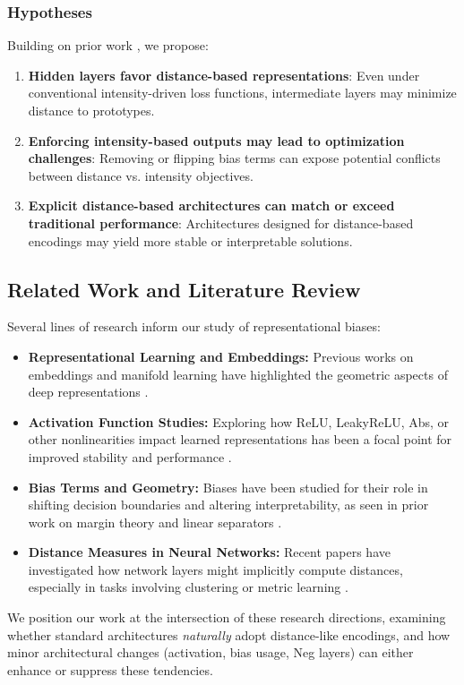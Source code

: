 \subsubsection{Hypotheses}
Building on prior work \cite{oursland2024,bishop2006pattern}, we propose:
\begin{enumerate}
    \item \textbf{Hidden layers favor distance-based representations}: Even under conventional intensity-driven loss functions, intermediate layers may minimize distance to prototypes.
    \item \textbf{Enforcing intensity-based outputs may lead to optimization challenges}: Removing or flipping bias terms can expose potential conflicts between distance vs. intensity objectives.
    \item \textbf{Explicit distance-based architectures can match or exceed traditional performance}: Architectures designed for distance-based encodings may yield more stable or interpretable solutions.
\end{enumerate}

\subsection{Related Work and Literature Review}
Several lines of research inform our study of representational biases:
\begin{itemize}
    \item \textbf{Representational Learning and Embeddings:} Previous works on embeddings and manifold learning have highlighted the geometric aspects of deep representations \cite{bishop2006pattern, jolliffe2002pca}. 
    \item \textbf{Activation Function Studies:} Exploring how ReLU, LeakyReLU, Abs, or other nonlinearities impact learned representations has been a focal point for improved stability and performance \cite{nair2010rectified}.
    \item \textbf{Bias Terms and Geometry:} Biases have been studied for their role in shifting decision boundaries and altering interpretability, as seen in prior work on margin theory and linear separators \cite{lipton2018mythos}.
    \item \textbf{Distance Measures in Neural Networks:} Recent papers have investigated how network layers might implicitly compute distances, especially in tasks involving clustering or metric learning \cite{oursland2024}.
\end{itemize}
We position our work at the intersection of these research directions, examining whether standard architectures \emph{naturally} adopt distance-like encodings, and how minor architectural changes (activation, bias usage, Neg layers) can either enhance or suppress these tendencies.

